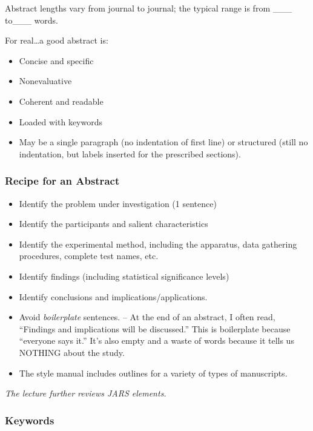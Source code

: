 \documentclass[
  11pt,
]{book}
\providecommand{\tightlist}{%
  \setlength{\itemsep}{0pt}\setlength{\parskip}{0pt}}
\begin{document}
Abstract lengths vary from journal to journal; the typical range is from \_\_\_ to\_\_\_ words.

For real\ldots a good abstract is:

\begin{itemize}
\tightlist
\item
  Concise and specific
\item
  Nonevaluative
\item
  Coherent and readable
\item
  Loaded with keywords
\item
  May be a single paragraph (no indentation of first line) or structured (still no indentation, but labels inserted for the prescribed sections).
\end{itemize}

\hypertarget{recipe-for-an-abstract}{%
\subsubsection{Recipe for an Abstract}\label{recipe-for-an-abstract}}

\begin{itemize}
\tightlist
\item
  Identify the problem under investigation (1 sentence)
\item
  Identify the participants and salient characteristics
\item
  Identify the experimental method, including the apparatus, data gathering procedures, complete test names, etc.
\item
  Identify findings (including statistical significance levels)
\item
  Identify conclusions and implications/applications.
\item
  Avoid \emph{boilerplate} sentences.
  -- At the end of an abstract, I often read, ``Findings and implications will be discussed.'' This is boilerplate because ``everyone says it.'' It's also empty and a waste of words because it tells us NOTHING about the study.
\item
  The style manual includes outlines for a variety of types of manuscripts.
\end{itemize}

\emph{The lecture further reviews JARS elements.}

\hypertarget{keywords}{%
\subsubsection{Keywords}\label{keywords}}
\end{document}
